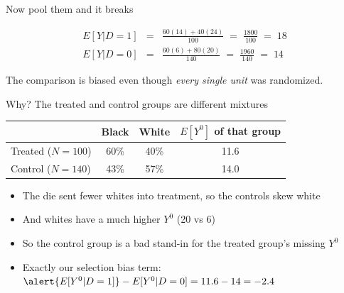 \documentclass{beamer}
\begin{document}
\begin{frame}{Now pool them and it breaks}

\begin{eqnarray*}
E[Y|D=1] &=& \frac{60(14) + 40(24)}{100} \;=\; \frac{1800}{100} \;=\; 18 \\
E[Y|D=0] &=& \frac{60(6) + 80(20)}{140} \;=\; \frac{1960}{140} \;=\; 14
\end{eqnarray*}

\vspace{0.3em}

\begin{center}
\end{center}

\centering
\textcolor{harvardcrimson}{\small The comparison is biased even though \emph{every single unit} was randomized.}

\end{frame}


\begin{frame}{Why? The treated and control groups are different mixtures}

\centering
{\small
\begin{tabular}{lccc}
\toprule
 & Black & White & $E[Y^0]$ of that group \\
\midrule
Treated ($N=100$) & 60\% & 40\% & 11.6 \\
Control ($N=140$) & 43\% & 57\% & 14.0 \\
\bottomrule
\end{tabular}}

\vspace{0.8em}
\raggedright

\begin{itemize}
\item The die sent fewer whites into treatment, so the controls skew white
\item And whites have a much higher $Y^0$ (20 vs 6)
\item So the control group is a bad stand-in for the treated group's missing $Y^0$
\item Exactly our selection bias term: $\alert{E[Y^0|D=1]} - E[Y^0|D=0] = 11.6 - 14 = -2.4$
\end{itemize}

\end{frame}
\end{document}
